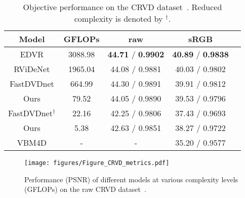 \documentclass[final]{cvpr}
\begin{document}
    \begin{table}[t!]
        \centering
        \small
        \begin{tabular}{ccccc}
            \hline  

            Model                     & GFLOPs      & raw                               & sRGB                               \\
            \hline\hline
            EDVR                      & 3088.98     &\textbf{44.71} / \textbf{0.9902 }  & \textbf{40.89} / \textbf{0.9838}   \\
 
            RViDeNet                  & 1965.04     & 44.08 / 0.9881                    & 40.03 / 0.9802                     \\
            FastDVDnet                & 664.99      & 44.30 / 0.9891                    & 39.91 / 0.9812                     \\
            Ours                      & 79.52       & 44.05 / 0.9890                    & 39.53 / 0.9796                     \\
            \hline

            FastDVDnet$^\dagger$      & 22.16       & 42.25 / 0.9806                    & 37.43 / 0.9693                     \\
            
            \rowcolor{LightYellow}
            Ours                      & 5.38        & 42.63 / 0.9851                    & 38.27 / 0.9722                     \\
            VBM4D                     & -           & -                                 & 35.20 / 0.9577                     \\
            \hline 
        \end{tabular}
        \caption{Objective performance on the CRVD dataset~\cite{yue2020supervised}. Reduced complexity is denoted by $^\dagger$.}
        \label{tab:CRVD}
    \end{table}
    
    \begin{figure}[ht!]
        \centering
        \texttt{[image: figures/Figure\_CRVD\_metrics.pdf]}
        \vspace{-0.25cm}
        \caption{Performance (PSNR) of different models at various complexity levels (GFLOPs) on the raw CRVD dataset~\cite{yue2020supervised}.}
        \vspace{-0.15cm}
        \label{fig:psnr_gflop} 
    \end{figure}
\end{document}
